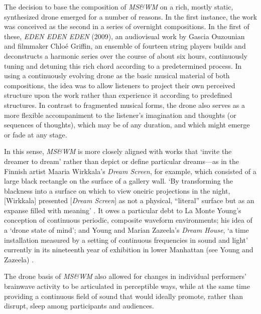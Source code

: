 The decision to base the composition of \textit{MS\&WM }on a rich, mostly
static, synthesized drone emerged for a number of reasons.  In the first
instance, the work was conceived as the second in a series of overnight
compositions. In the first of these, \textit{EDEN EDEN EDEN} (2009), an
audiovisual work by Gascia Ouzounian and filmmaker Chlo\'e Griffin, an ensemble of
fourteen string players builds and deconstructs a harmonic series over the course
of about six hours, continuously tuning and detuning this rich chord according to
a predetermined process.  In using a continuously evolving drone as the basic
musical material of both compositions, the idea was to allow listeners to project
their own perceived structure upon the work rather than experience it according
to predefined structures. In contrast to fragmented musical forms, the drone also
serves as a more flexible accompaniment to the listener's imagination and
thoughts (or sequences of thoughts), which may be of any duration, and which
might emerge or fade at any stage.

In this sense, \textit{MS\&WM }is more closely aligned with works that `invite
the dreamer to dream' rather than depict or define particular dreams---as in the
Finnish artist Maaria Wirkkala's \textit{Dream Screen}, for example, which
consisted of a large black rectangle on the surface of a gallery wall. `By
transforming the blackness into a surface on which to view oneiric projections in
the night, [Wirkkala] presented [\textit{Dream Screen}] as not a physical,
``literal'' surface but as an expanse filled with meaning' \cite[p.31]{Gamwell:2000}. It owes a particular debt to La Monte Young's conception of continuous
periodic, composite waveform environments; his idea of a `drone state of mind';
and Young and Marian Zazeela's \textit{Dream House}, `a time installation
measured by a setting of continuous frequencies in sound and light' currently in
its nineteenth year of exhibition in lower Manhattan (see Young and Zazeela) \cite{Young:2012}.

The drone basis of \textit{MS\&WM }also allowed for changes in individual
performers' brainwave activity to be articulated in perceptible ways, while at
the same time providing a continuous field of sound that would ideally promote,
rather than disrupt, sleep among participants and audiences.

